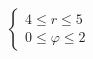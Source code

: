 \documentclass[preview]{standalone}
\begin{document}
\begin{align*}
\left\{ \begin{array}{l}4 \leq r \leq 5 \\0 \leq \varphi \leq 2\end{array} \right.
\end{align*}
\end{document}
